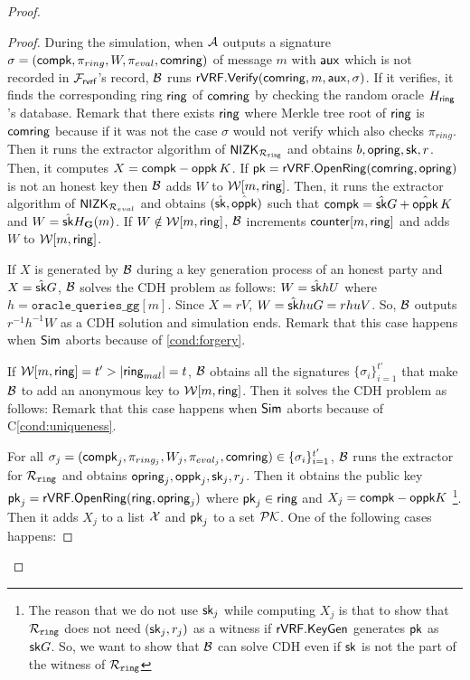 \begin{proof}
\begin{proof}
			
			During the simulation, when $ \mathcal{A} $ outputs a signature $ \sigma = (\mathsf{compk},\pi_{ring},W,\pi_{eval},\mathsf{comring}) $ of message $ m $ with $ \mathsf{aux} $ which is not recorded in $ \mathcal{F}_{\textsf{rvrf}} $'s record, $ \mathcal{B} $ runs $ {\mathsf{rVRF}}.{\mathsf{Verify}}(\mathsf{comring},m, \mathsf{aux}, \sigma) $. If it verifies, it finds the corresponding ring $ \mathsf{ring} $ of $ \mathsf{comring} $ by checking the random oracle $ H_\mathsf{ring} $'s database. Remark that there exists $ \mathsf{ring} $ where Merkle tree root of $ \mathsf{ring} $ is $ \mathsf{comring} $ because if it was not the case $ \sigma $ would not verify which also checks  $ \pi_{ring} $. 
			Then it runs the extractor algorithm of $ {\mathsf{NIZK}}_{\mathcal{R}_{\mathtt{ring}}} $ and obtains $ b, \mathsf{opring}, \mathsf{sk},r $. Then, it computes $ X = \mathsf{compk} - \mathsf{oppk} \, K $.
			If $ \mathsf{pk} = {\mathsf{rVRF}}.{\mathsf{OpenRing}}(\mathsf{comring},\mathsf{opring}) $ is not an honest key then $\mathcal{B} $ adds $ W $  to $ \mathcal{W}[m, \mathsf{ring}] $.  
			Then, it  runs the extractor algorithm of $ {\mathsf{NIZK}}_{\mathcal{R}_{eval}} $ and obtains $(\hat{\mathsf{sk}},\hat{\mathsf{oppk}} )$ such that $ \mathsf{compk} = \hat{\mathsf{sk}}G + \hat{\mathsf{oppk}} \, K $ and $ W = \hat{\mathsf{sk}} H_{\mathbf{G}}(m) $. If  $ W \notin \mathcal{W}[m, \mathsf{ring}] $, $ \mathcal{B} $ increments  $ \mathsf{counter}[m,\mathsf{ring}] $ and adds $ W $ to $ \mathcal{W}[m,\mathsf{ring}] $.
			
			If $ X  $ is generated by $ \mathcal{B} $ during a key generation process of an honest party and $ X = \hat{\mathsf{sk}}G $, $ \mathcal{B} $ solves the CDH problem as follows: $ W = \hat{\mathsf{sk}} h U $ where $ h = \mathtt{oracle\_queries\_gg}[m] $. Since $ X = r V $, $ W = \hat{\mathsf{sk}}huG =rhuV $. So, $ \mathcal{B} $ outputs $ r^{-1}h^{-1}W $ as a CDH solution and simulation ends. Remark that this case happens when $ \mathsf{Sim} $ aborts because of \ref{cond:forgery}.
			
			If $ \mathcal{W}[m,\mathsf{ring}] =t' > |\mathsf{ring}_{mal}| =t$, $ \mathcal{B} $ obtains all the signatures $ \{\sigma_i\}_{i =1}^{t'} $ that make $ \mathcal{B} $ to add an anonymous key to $ \mathcal{W}[m,\mathsf{ring}] $. Then it solves the CDH problem as follows: Remark that this case happens when $ \mathsf{Sim} $ aborts because of C\ref{cond:uniqueness}.
			
			For all $ \sigma_j =(\mathsf{compk}_j,\pi_{ring_j},W_j,\pi_{eval_j},\mathsf{comring}) \in \{\sigma_i\}_{i =1}^{t'} $, $ \mathcal{B} $ runs the extractor for $ \mathcal{R}_{\mathtt{ring}} $ and obtains $\mathsf{opring}_j, \mathsf{oppk}_j, \mathsf{sk}_j, r_j$. Then it obtains the public key $ \mathsf{pk}_j = {\mathsf{rVRF}}.{\mathsf{OpenRing}}(\mathsf{ring}, \mathsf{opring}_j) $ where $ \mathsf{pk}_j \in \mathsf{ring} $ and  $ X_j = \mathsf{compk}- \mathsf{oppk} K $ \footnote{The reason that we do not use $ \mathsf{sk}_j $ while computing $ X_j $ is that to show that $ \mathcal{R}_{\mathtt{ring}} $ does not need $ (\mathsf{sk}_j,r_j) $ as a witness if $ {\mathsf{rVRF}}.{\mathsf{KeyGen}} $ generates $ \mathsf{pk}  $ as $ \mathsf{sk}G $. So, we want to show that $ \mathcal{B} $ can solve CDH even if $ \mathsf{sk} $ is not the part of the witness of $ \mathcal{R}_{\mathtt{ring}} $}. Then it adds $ X_j $ to a list $ {\mathcal{X}}  $ and $ \mathsf{pk}_j $ to a set $ {\mathcal{PK}} $. One of the following cases happens:
			

\end{proof}
\end{proof}
